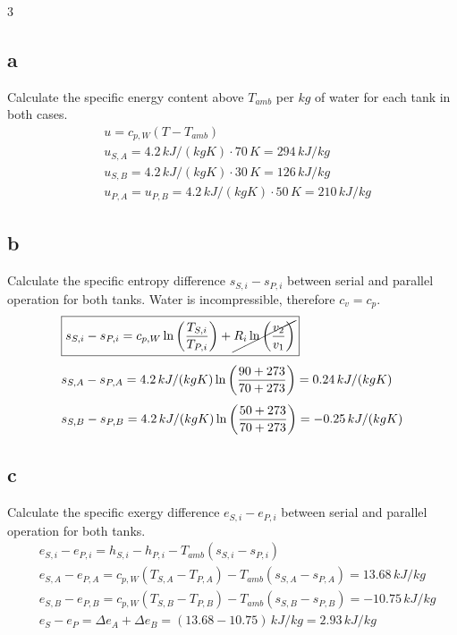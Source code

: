 \documentclass[9pt, landscape, a4paper]{article}
\begin{document}
\begin{multicols*}{3}
\subsection*{a}
Calculate the specific energy content above $T_{amb}$ per $kg$ of water for each
tank in both cases.
\begingroup
\scriptsize
\begin{align*}
  & \boxed{u = c_{p,W}\left(T-T_{amb}\right)}\\[.8ex]
  & u_{S,A}=4.2\,kJ/(kgK)\cdot70\,K=294\,kJ/kg\\[.8ex]
  & u_{S,B}=4.2\,kJ/(kgK)\cdot30\,K=126\,kJ/kg\\[.8ex]
  & u_{P,A}=u_{P,B}=4.2\,kJ/(kgK)\cdot50\,K=210\,kJ/kg
\end{align*}
\endgroup

\subsection*{b}
Calculate the specific entropy difference $s_{S,i}-s_{P,i}$ between serial and
parallel operation for both tanks. Water is incompressible, therefore
$c_v=c_p$.
\begingroup
\scriptsize
\begin{align*}
  & \boxed{s_{S,i}-s_{P,i}=c_{p,W}\ln\left(\dfrac{T_{S,i}}{T_{P,i}}\right)+\cancel{R_i\ln \left(\dfrac{v_2}{v_1}\right)}}\\[.8ex]
  & s_{S,A}-s_{P,A}=4.2\,kJ/(kgK)\ln\left(\dfrac{90+273}{70+273}\right)
  =0.24\,kJ/(kgK)\\[.8ex]
  & s_{S,B}-s_{P,B}=4.2\,kJ/(kgK)\ln\left(\dfrac{50+273}{70+273}\right)
  =-0.25\,kJ/(kgK)
\end{align*}
\endgroup

\subsection*{c}
Calculate the specific exergy difference $e_{S,i}-e_{P,i}$ between serial and
parallel operation for both tanks.
\begingroup
\scriptsize
\begin{align*}
  & \boxed{e_{S,i}-e_{P,i} = h_{S,i}-h_{P,i}-T_{amb}\left(s_{S,i}-s_{P,i}\right)}\\[.8ex]
  & e_{S,A}-e_{P,A}
  = c_{p,W}\left(T_{S,A}-T_{P,A}\right)
  -T_{amb}\left(s_{S,A}-s_{P,A}\right)
  =13.68\,kJ/kg\\[.8ex]
  & e_{S,B}-e_{P,B}
  = c_{p,W}\left(T_{S,B}-T_{P,B}\right)
  -T_{amb}\left(s_{S,B}-s_{P,B}\right)
  =-10.75\,kJ/kg\\[.8ex]
  & e_S-e_P=\Delta e_A+\Delta e_B
  =\left(13.68-10.75\right)\,kJ/kg=2.93\,kJ/kg
\end{align*}
\endgroup


\end{multicols*}
\end{document}
